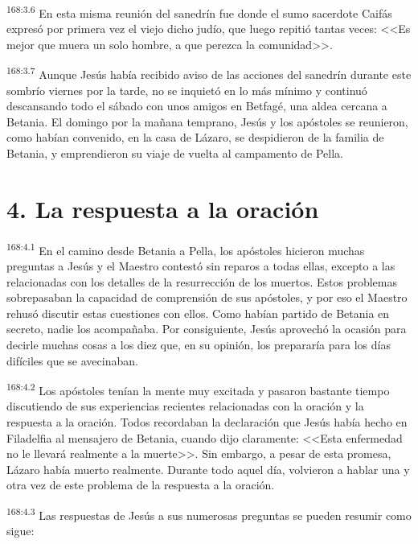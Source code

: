 \par 
\textsuperscript{168:3.6} En esta misma reunión del sanedrín fue donde el sumo sacerdote Caifás expresó por primera vez el viejo dicho judío, que luego repitió tantas veces: <<Es mejor que muera un solo hombre, a que perezca la comunidad>>.

\par 
\textsuperscript{168:3.7} Aunque Jesús había recibido aviso de las acciones del sanedrín durante este sombrío viernes por la tarde, no se inquietó en lo más mínimo y continuó descansando todo el sábado con unos amigos en Betfagé, una aldea cercana a Betania. El domingo por la mañana temprano, Jesús y los apóstoles se reunieron, como habían convenido, en la casa de Lázaro, se despidieron de la familia de Betania, y emprendieron su viaje de vuelta al campamento de Pella.

\section*{4. La respuesta a la oración}
\par 
\textsuperscript{168:4.1} En el camino desde Betania a Pella, los apóstoles hicieron muchas preguntas a Jesús y el Maestro contestó sin reparos a todas ellas, excepto a las relacionadas con los detalles de la resurrección de los muertos. Estos problemas sobrepasaban la capacidad de comprensión de sus apóstoles, y por eso el Maestro rehusó discutir estas cuestiones con ellos. Como habían partido de Betania en secreto, nadie los acompañaba. Por consiguiente, Jesús aprovechó la ocasión para decirle muchas cosas a los diez que, en su opinión, los prepararía para los días difíciles que se avecinaban.

\par 
\textsuperscript{168:4.2} Los apóstoles tenían la mente muy excitada y pasaron bastante tiempo discutiendo de sus experiencias recientes relacionadas con la oración y la respuesta a la oración. Todos recordaban la declaración que Jesús había hecho en Filadelfia al mensajero de Betania, cuando dijo claramente: <<Esta enfermedad no le llevará realmente a la muerte>>. Sin embargo, a pesar de esta promesa, Lázaro había muerto realmente. Durante todo aquel día, volvieron a hablar una y otra vez de este problema de la respuesta a la oración.

\par 
\textsuperscript{168:4.3} Las respuestas de Jesús a sus numerosas preguntas se pueden resumir como sigue:

